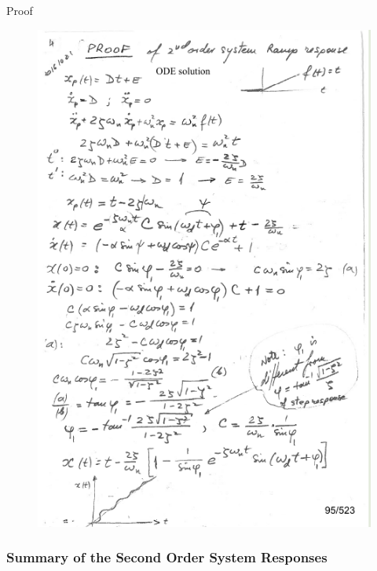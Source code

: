 \documentclass[12pt,letter]{article}
\numberwithin{ex}{section} %
\numberwithin{re}{section} %
\newcommand{\gr}[1]{\textcolor[rgb]{0.00,0.50,0.00}{#1}}
\numberwithin{equation}{section}	%
\begin{document}
\begin{mdframed}[middlelinewidth=0.5mm]
	\begin{center}
		\gr{Proof}
	\end{center}
	
	\begin{figure}[H]
		\centering
		\includegraphics[width=5.5in]{../figures/x_t_time_response_2nd_order_ramp_proof_1}
	\end{figure}
\end{mdframed}

\subsubsection{Summary of the Second Order System Responses}
\end{document}
